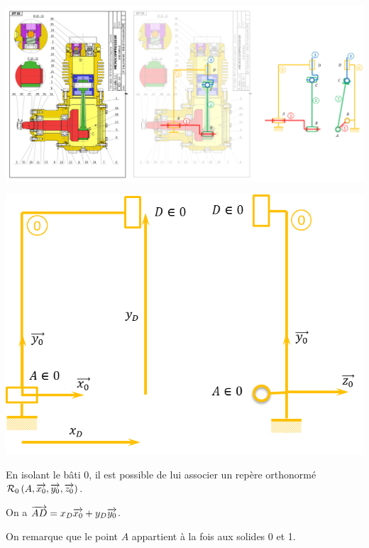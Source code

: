 \documentclass[10pt,oneside]{article}
\begin{document}
\begin{center}
\includegraphics[width=\textwidth]{png/modelisme}
\end{center}



\begin{minipage}[c]{.6\linewidth}
\begin{center}
\includegraphics[width=\textwidth]{png/piece_0}
\end{center}
\end{minipage}\hfill
\begin{minipage}[c]{.3\linewidth}
En isolant le bâti 0, il est possible de lui associer un repère orthonormé $\mathcal{R}_0 \left(A,\overrightarrow{x_0},\overrightarrow{y_0},\overrightarrow{z_0}\right)$. 

On a $\overrightarrow{AD}=x_D \overrightarrow{x_0} + y_D \overrightarrow{y_0}$.

On remarque que le point $A$ appartient à la fois aux solides 0 et 1. 
\end{minipage}
\end{document}

